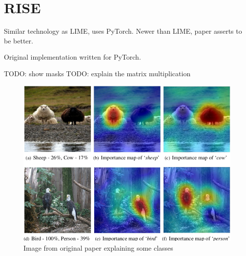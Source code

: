 \section{RISE}
Similar technology as LIME, uses PyTorch. Newer than LIME, paper asserts to be better.

Original implementation written for PyTorch.

TODO: show masks
TODO: explain the matrix multiplication

\begin{figure}[h]
\centering
\caption{Image from original paper explaining some classes}
\includegraphics[width=14cm]{chapters/02_methods/images/rise.png}
\end{figure}
